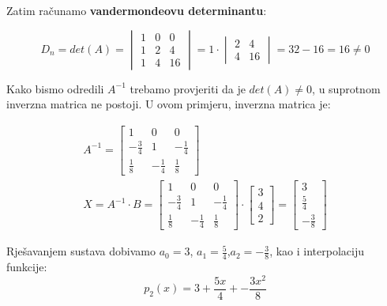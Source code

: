 Zatim računamo \textbf{vandermondeovu determinantu}:

$$
D_n =
det(A) =
\begin{vmatrix}
1 & 0 & 0 \\
1 & 2 & 4 \\
1 & 4 & 16
\end{vmatrix}
= 1 \cdot
\begin{vmatrix}
2 & 4 \\
4 & 16
\end{vmatrix}
= 32 - 16 = 16 \neq 0
$$

\begin{multicols}{2}

Kako bismo odredili $A^{-1}$ trebamo provjeriti da je $det(A)\neq0$, u suprotnom inverzna matrica ne postoji. U ovom primjeru, inverzna matrica je:

\begin{gather*}
A^{-1} =
\begin{bmatrix}
1 & 0 & 0\\
-{\frac{3}{4}} & 1 & -{\frac{1}{4}}\\
{\frac{1}{8}} & -{\frac{1}{4}} & {\frac{1}{8}}
\end{bmatrix}\\
X = A^{-1}\cdot B =
\begin{bmatrix}
1 & 0 & 0\\
-\frac{3}{4} & 1 & -\frac{1}{4}\\
\frac{1}{8} & -\frac{1}{4} & \frac{1}{8}
\end{bmatrix}
\cdot
\begin{bmatrix}
3 \\ 4 \\ 2
\end{bmatrix}
=
\begin{bmatrix}
3 \\ \frac{5}{4} \\ -\frac{3}{8}
\end{bmatrix}
\end{gather*}

Rješavanjem sustava dobivamo $a_0=3$, $a_1=\frac{5}{4}$,\break$a_2=-\frac{3}{8}$,
kao i interpolaciju funkcije:
$$
p_2(x) = 3 + \frac{5x}{4} + -\frac{3x^2}{8}
$$

\newcolumn

\vspace*{0pt}


\end{multicols}

